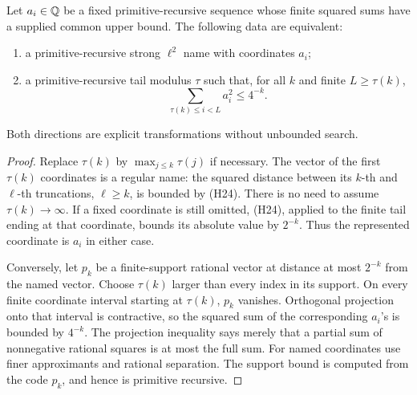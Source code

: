 \begin{theorem}
\label{thm:tail-equivalence}
Let \(a_i\in\mathbb Q\) be a fixed primitive-recursive sequence whose finite squared
sums have a supplied common upper bound. The following data are equivalent:
\begin{enumerate}
\item a primitive-recursive strong \(\ell^2\) name with coordinates \(a_i\);
\item a primitive-recursive tail modulus \(\tau\) such that, for all \(k\)
and finite \(L\geq\tau(k)\),
\[
                    \sum_{\tau(k)\leq i<L}a_i^2\leq4^{-k}.
\tag{H24}
\]
\end{enumerate}
Both directions are explicit transformations without unbounded search.
\end{theorem}
\begin{proof}
Replace \(\tau(k)\) by \(\max_{j\leq k}\tau(j)\) if necessary.
The vector of the first \(\tau(k)\) coordinates is a regular name:
the squared distance between its \(k\)-th and \(\ell\)-th truncations,
\(\ell\geq k\), is bounded by (H24).
There is no need to assume \(\tau(k)\to\infty\). If a fixed coordinate is
still omitted, (H24), applied to the finite tail ending at that coordinate,
bounds its absolute value by \(2^{-k}\). Thus the represented coordinate
is \(a_i\) in either case.

Conversely, let \(p_k\) be a finite-support rational vector at distance
at most \(2^{-k}\) from the named vector. Choose \(\tau(k)\) larger than
every index in its support. On every finite coordinate interval starting at
\(\tau(k)\), \(p_k\) vanishes. Orthogonal projection onto that interval is
contractive, so the squared sum of the corresponding \(a_i\)'s is bounded
by \(4^{-k}\). The projection inequality says merely that a partial sum of
nonnegative rational squares is at most the full sum. For named coordinates
use finer approximants and rational separation. The support bound is
computed from the code \(p_k\), and hence is primitive recursive.
\end{proof}

